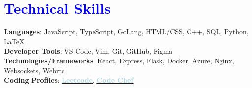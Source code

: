 \documentclass[letterpaper,11pt]{article}
\begin{document}
        \section{\textcolor{blue}{Technical Skills}}
            \vspace{2pt}
        \begin{itemize}[leftmargin=0.0in, label={}]
              \normalsize{\item{
              \textbf{Languages}{: JavaScript, TypeScript, GoLang, HTML/CSS, C++, SQL, Python, LaTeX} \\
        	 \vspace{4pt}
              \textbf{Developer Tools}{: VS Code, Vim, Git, GitHub, Figma } \\
        	\vspace{4pt}
              \textbf{Technologies/Frameworks}{: React, Express, Flask, Docker, Azure, Nginx, Websockets, Webrtc} \\
            \vspace{4pt}
              \textbf{Coding Profiles}{: \href{https://leetcode.com/Rishabh-malhotraa/}{\underline{\textbf{\textcolor{lightblue}{Leetcode}}}}, \href{https://www.codechef.com/users/rish_bish}{\underline{\textbf{\textcolor{lightblue}{Code Chef}}}} } \\
            }}
        \end{itemize}
    
\end{document}
